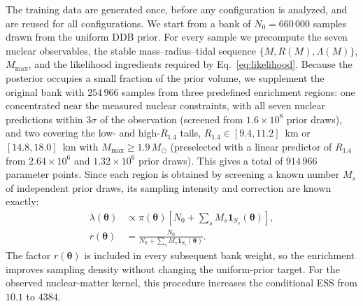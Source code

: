 \documentclass[aps,prd,twocolumn,superscriptaddress,nofootinbib,longbibliography]{revtex4-2}
\newcommand{\msun}{\ensuremath{M_\odot}}
\begin{document}
The training data are generated once, before any
configuration is analyzed, and are reused for all configurations. We start from
a bank of $N_0=660\,000$ samples drawn from the uniform DDB prior. For every
sample we precompute the seven nuclear observables,
the stable mass--radius--tidal sequence $\{M,R(M),\Lambda(M)\}$, $M_{\max}$,
and the likelihood ingredients required by Eq.~\eqref{eq:likelihood}. Because
the posterior occupies a small fraction of the prior volume, we supplement the
original bank with $254\,966$ samples from three predefined enrichment regions:
one concentrated near the measured nuclear constraints, with all seven nuclear
predictions within $3\sigma$ of the observation (screened from
$1.6\times10^{8}$ prior draws), and two covering the low- and high-$R_{1.4}$
tails, $R_{1.4}\in[9.4,11.2]$~km or $[14.8,18.0]$~km with
$M_{\max}\geq1.9\,\msun$ (preselected with a linear predictor of $R_{1.4}$ from
$2.64\times10^{6}$ and $1.32\times10^{6}$ prior draws). This gives a total of $914\,966$ parameter
points. Since each region is obtained by screening a known number $M_s$ of
independent prior draws, its sampling intensity and correction are known
exactly:
\begin{align}
\lambda(\bm\theta)&\propto\pi(\bm\theta)
 \left[N_0+\sum_s M_s\mathbf 1_{S_s}(\bm\theta)\right],
 \label{eq:anet-bank-intensity}\\
r(\bm\theta)&=
 \frac{N_0}{N_0+\sum_sM_s\mathbf 1_{S_s}(\bm\theta)}.
 \label{eq:anet-bank-correction}
\end{align}
The factor $r(\bm\theta)$ is included in every subsequent bank weight, so the
enrichment improves sampling density without changing the uniform-prior target.
For the observed nuclear-matter kernel, this procedure increases the
conditional ESS from $10.1$ to $4384$.
\end{document}
